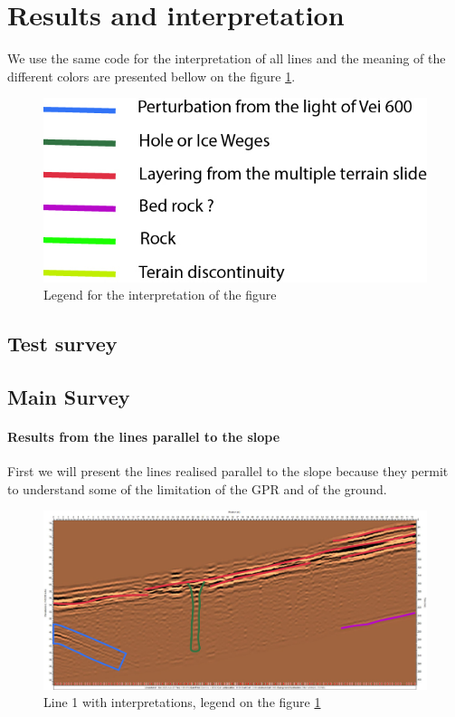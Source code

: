 \newpage
\section{Results and interpretation}

We use the same code for the interpretation of all lines and the meaning of the different colors are presented bellow on the figure \ref{fig:legend}.

\begin{figure}[H]
    \centering
    \includegraphics[width=0.5\linewidth]{Images/00_Results/Legend.jpg}
    \caption{Legend for the interpretation of the figure }
    \label{fig:legend}
\end{figure}

\subsection{Test survey}

\subsection{Main Survey}

\paragraph{Results from the lines parallel to the slope} First we will present the lines realised parallel to the slope because they permit to understand some of the limitation of the GPR and of the ground.

\begin{figure}
    \centering
    \includegraphics[width=\linewidth]{Images/00_Results/line1_edited.jpg}
    \caption{Line 1 with interpretations, legend on the figure \ref{fig:legend}}
    \label{fig:line1}
\end{figure}

